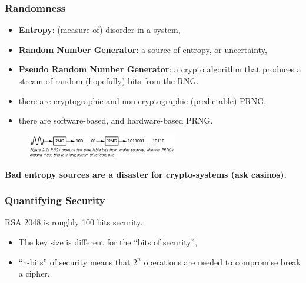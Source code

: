 \documentclass{beamer}
\begin{document}
\begin{frame}
        \frametitle{Randomness}

        \begin{itemize}
          \item {\bf Entropy}: (measure of) disorder in a system,
          \item {\bf Random Number Generator}: a source of entropy, or uncertainty,
          \item {\bf Pseudo Random Number Generator}: a crypto algorithm that
            produces a stream of random (hopefully) bits from the RNG.
          \item there are cryptographic and non-cryptographic (predictable) PRNG,
          \item there are software-based, and hardware-based PRNG.
        \end{itemize}

            \begin{figure}[h!]
              \includegraphics[width=250px]{./random.png}
            \end{figure}

         {\bf Bad entropy sources are a disaster for crypto-systems (ask casinos).}

\end{frame}

\begin{frame}
        \frametitle{Quantifying Security}
       RSA 2048 is roughly 100 bits security. 
        \begin{itemize}
          \item The key size is different for the ``bits of security'',
          \item ``n-bits'' of security means that $2^n$ operations are needed to
            compromise break a cipher. 
        \end{itemize}

\end{frame}
\end{document}
